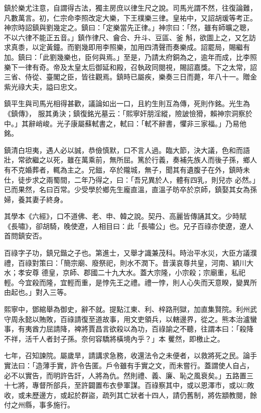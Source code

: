 \begin{pinyinscope}
 鎮於樂尤注意，自謂得古法，獨主房庶以律生尺之說。司馬光謂不然，往復論難，凡數萬言。初，仁宗命李照改定大樂，下王樸樂三律。皇祐中，又詔胡瑗等考正。神宗時詔鎮與劉幾定之。鎮曰：「定樂當先正律。」神宗曰：「然，雖有師曠之聰，不以六律不能正五音。」鎮作律尺、龠合、升斗、豆區、釜
 斛，欲圖上之，又乞訪求真黍，以定黃鐘。而劉幾即用李照樂，加用四清聲而奏樂成。詔罷局，賜繼有加。鎮曰：「此劉幾樂也，臣何與焉。」至是，乃請太府銅為之，逾年而成，比李照樂下一律有奇。帝及太皇太后御延和殿，召執政同閱視，賜詔嘉獎。下之太常，詔三省、侍從、臺閣之臣，皆往觀焉。鎮時已屬疾，樂奏三日而薨，年八十一。贈金紫光祿大夫，謚曰忠文。



 鎮平生與司馬光相得甚歡，議論如出一口，且約生則互為傳，死則作銘。光生為《鎮傳》，
 服其勇決；鎮復銘光墓云：「熙寧奸朋淫縱，險詖憸猾，賴神宗洞察於中。」其辭峭峻。光子康屬蘇軾書之，軾曰：「軾不辭書，懼非三家福。」乃易他銘。



 鎮清白坦夷，遇人必以誠，恭儉慎默，口不言人過。臨大節，決大議，色和而語壯，常欲繼之以死，雖在萬乘前，無所屈。篤於行義，奏補先族人而後子孫，鄉人有不克婚葬者，輒為主之。兄鎡，卒於隴城，無子，聞其有遺腹子在外，鎮時未仕，徒步求之兩蜀間，二年乃得之，曰：「吾兄異於人，體有四乳，則兒亦
 必然。」已而果然，名曰百常。少受學於鄉先生龐直溫，直溫子昉卒於京師，鎮娶其女為孫婦，養其妻子終身。



 其學本《六經》，口不道佛、老、申、韓之說。契丹、高麗皆傳誦其文。少時賦《長嘯》，卻胡騎，晚使遼，人相目曰：此「長嘯公」也。兄子百祿亦使遼，遼人首問鎮安否。



 百祿字子功，鎮兄鍇之子也。第進士，又舉才識兼茂科。時治平水災，大臣方議濮禮，百祿對策曰：「簡宗廟、廢祭祀，則水不潤下。昔漢哀尊共皇，河南、穎川大水；孝安尊
 德皇，京師、郡國二十九大水。蓋大宗隆，小宗殺；宗廟重，私祀輕。今宜殺而隆，宜輕而重，是悖先王之禮。禮一悖，則人心失而天意睽，變異所由起也。」對入三等。



 熙寧中，鄧綰舉為御史，辭不就。提點江東、利、梓路刑獄，加直集賢院。利州武守周永懿以賄敗，百祿請復至道故事，用文吏領兵，以轄邊界，從之。熊本治瀘蠻事，有夷酋力屈請降，裨將賈昌言欲殺以為功，百祿諭之不聽，往謂本曰：「殺降不祥，活千人者封子孫。奈何容驕將橫境內乎？」本
 矍然，即檄止之。



 七年，召知諫院。屬歲旱，請講求急務，收還法令之未便者，以救將死之民。論手實法曰：「造薄手實，許令告匿。戶令雖有手實之文，而未嘗行。蓋謂使人自占，必不以實告，而明許告訐，人將為仇。然則禮、義、廉、恥之風衰矣。」五路置三十七將，專督所部兵，至許闢置布衣參軍謀。百祿察其中，或以恩澤市，或以□敗收，或未歷邊方，或起於群盜，疏列其亡狀者十四人，請仍舊制，將佐顓教閱，餘付之州縣，事多施行。




\end{pinyinscope}
